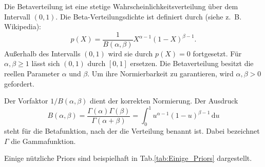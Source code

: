 Die Betaverteilung ist eine stetige Wahrscheinlichkeitsverteilung über dem Intervall $( 0 , 1 )$.
Die Beta-Verteilungsdichte ist definiert durch (siehe z.~B. Wikipedia): 
\[
p(X) = \frac{1}{B(\alpha,\beta)} X^{\alpha-1}(1-X)^{\beta-1}.
\]
Außerhalb des Intervalls $(0,1)$ wird sie durch $p(X)=0$ fortgesetzt. 
Für $\alpha,\beta \geq 1$ lässt sich $(0,1)$ durch $[0,1]$ ersetzen. Die Betaverteilung besitzt die reellen Parameter $\alpha$ und $\beta$. Um ihre Normierbarkeit zu garantieren, wird $\alpha,\beta > 0$ gefordert.

Der Vorfaktor $1/B(\alpha,\beta)$ dient der korrekten Normierung. Der Ausdruck
\[B(\alpha,\beta) = \frac{\Gamma(\alpha) \Gamma(\beta)}{\Gamma(\alpha+\beta)} = \int_0^1 u^{\alpha-1} (1-u)^{\beta-1}\, \mathrm{d}u 
\]
steht für die Betafunktion, nach der die Verteilung benannt ist. Dabei bezeichnet $\Gamma$ die Gammafunktion.

Einige nützliche Priors sind beispielhaft in Tab.\ref{tab:Einige_Priors} dargestellt.

